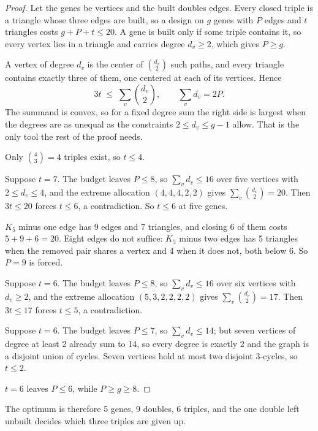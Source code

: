 \begin{proof}
 Let the genes be vertices and the built
doubles edges. Every closed triple is a triangle whose three edges are built, so
a design on $g$ genes with $P$ edges and $t$ triangles costs $g + P + t \le 20$.
A gene is built only if some triple contains it, so every vertex lies in a
triangle and carries degree $d_v \ge 2$, which gives $P \ge g$.

 A vertex of degree $d_v$ is the center of
$\binom{d_v}{2}$ such paths, and every triangle contains exactly three of them,
one centered at each of its vertices. Hence
\[
  3t \;\le\; \sum_{v} \binom{d_v}{2}, \qquad \sum_{v} d_v = 2P .
\]
The summand is convex, so for a fixed degree sum the right side is largest when
the degrees are as unequal as the constraints $2 \le d_v \le g-1$ allow. That is
the only tool the rest of the proof needs.

 Only $\binom{4}{3} = 4$ triples exist, so $t \le 4$.

 Suppose $t = 7$. The budget leaves $P \le 8$, so
$\sum_v d_v \le 16$ over five vertices with $2 \le d_v \le 4$, and the extreme
allocation $(4,4,4,2,2)$ gives $\sum_v \binom{d_v}{2} = 20$. Then $3t \le 20$
forces $t \le 6$, a contradiction. So $t \le 6$ at five genes.

 $K_5$ minus one edge has 9
edges and 7 triangles, and closing 6 of them costs $5 + 9 + 6 = 20$. Eight edges
do not suffice: $K_5$ minus two edges has 5 triangles when the removed pair
shares a vertex and 4 when it does not, both below 6. So $P = 9$ is forced.

 Suppose $t = 6$. The budget leaves $P \le 8$, so
$\sum_v d_v \le 16$ over six vertices with $d_v \ge 2$, and the extreme
allocation $(5,3,2,2,2,2)$ gives $\sum_v \binom{d_v}{2} = 17$. Then
$3t \le 17$ forces $t \le 5$, a contradiction.

 Suppose $t = 6$. The budget leaves $P \le 7$, so
$\sum_v d_v \le 14$; but seven vertices of degree at least 2 already sum to 14,
so every degree is exactly 2 and the graph is a disjoint union of cycles. Seven
vertices hold at most two disjoint 3-cycles, so $t \le 2$.

 $t = 6$ leaves $P \le 6$, while $P \ge g \ge 8$.
\end{proof}

The optimum is therefore 5 genes, 9 doubles, 6 triples, and the one double left
unbuilt decides which three triples are given up.

